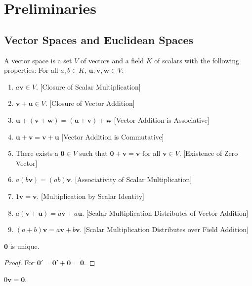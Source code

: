 \documentclass[crop=false,class=article,oneside]{standalone}
\begin{document}
    \ifx\ifsub\undefined
        \section*{Preliminaries}
        \setcounter{section}{1}
    \fi
    \subsection{Vector Spaces and Euclidean Spaces}
        \begin{definition}
        A vector space is a set $V$ of vectors and a field $K$ of scalars with the following properties: For all $a,b\in K$, $\mathbf{u,v,w}\in V$:
        \begin{enumerate}
            \item $a\mathbf{v} \in V$. \hfill [Closure of Scalar Multiplication]
            \item $\mathbf{v}+\mathbf{u} \in V$. \hfill [Closure of Vector Addition]
            \item $\mathbf{u}+(\mathbf{v}+\mathbf{w}) = (\mathbf{u}+\mathbf{v})+\mathbf{w}$ \hfill [Vector Addition is Associative]
            \item $\mathbf{u}+\mathbf{v}=\mathbf{v}+\mathbf{u}$ \hfill [Vector Addition is Commutative]
            \item There exists a $\mathbf{0}\in V$ such that $\mathbf{0}+\mathbf{v}=\mathbf{v}$ for all $\mathbf{v}\in V$. \hfill [Existence of Zero Vector]
            \item $a(b\mathbf{v}) = (ab)\mathbf{v}$. \hfill [Associativity of Scalar Multiplication]
            \item $1 \mathbf{v} = \mathbf{v}$. \hfill[Multiplication by Scalar Identity]
            \item $a(\mathbf{v}+\mathbf{u}) = a\mathbf{v}+a\mathbf{u}$. \hfill [Scalar Multiplication Distributes of Vector Addition]
            \item $(a+b)\mathbf{v}= a\mathbf{v}+b\mathbf{v}$. \hfill [Scalar Multiplication Distributes over Field Addition]
        \end{enumerate}
        \end{definition}
        \begin{theorem}
        $\mathbf{0}$ is unique.
        \end{theorem}
        \begin{proof}
        For $\mathbf{0}'=\mathbf{0}'+\mathbf{0}=\mathbf{0}$.
        \end{proof}
        \begin{theorem}
        $0\mathbf{v} = \mathbf{0}$.
        \end{theorem}
\end{document}

